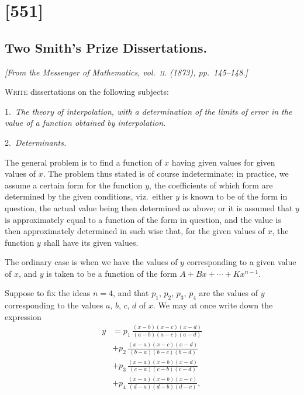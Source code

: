 \documentclass[11pt,a4paper]{article}
\theoremstyle{plain}
\theoremstyle{definition}
\begin{document}
\clearpage

\section{[551]}
\subsection{Two Smith's Prize Dissertations.}

\begin{center}
\textit{[From the Messenger of Mathematics, vol.~\textsc{ii}. (1873), pp.~145--148.]}
\end{center}

\textsc{Write} dissertations on the following subjects:

1.\ \textit{The theory of interpolation, with a determination of the limits of error in the
value of a function obtained by interpolation.}

2.\ \textit{Determinants.}

The general problem is to find a function of $x$ having given values for
given values of $x$. The problem thus stated is of course indeterminate; in practice, we
assume a certain form for the function $y$, the coefficients of which form are determined
by the given conditions, viz.\ either $y$ is known to be of the form in question, the
actual value being then determined as above; or it is assumed that $y$ is approximately
equal to a function of the form in question, and the value is then approximately
determined in such wise that, for the given values of $x$, the function $y$ shall have its
given values.

The ordinary case is when we have the values of $y$ corresponding to a given
value of $x$, and $y$ is taken to be a function of the form $A + Bx + \cdots + Kx^{n-1}$.

Suppose to fix the ideas $n = 4$, and that $p_1$, $p_2$, $p_3$, $p_4$ are the values of $y$ corresponding to the values $a$, $b$, $c$, $d$ of $x$. We may at once write down the expression
\begin{align*}
y &= p_1\,\frac{(x-b)(x-c)(x-d)}{(a-b)(a-c)(a-d)} \\
&+ p_2\,\frac{(x-a)(x-c)(x-d)}{(b-a)(b-c)(b-d)} \\
&+ p_3\,\frac{(x-a)(x-b)(x-d)}{(c-a)(c-b)(c-d)} \\
&+ p_4\,\frac{(x-a)(x-b)(x-c)}{(d-a)(d-b)(d-c)},
\end{align*}
\end{document}
